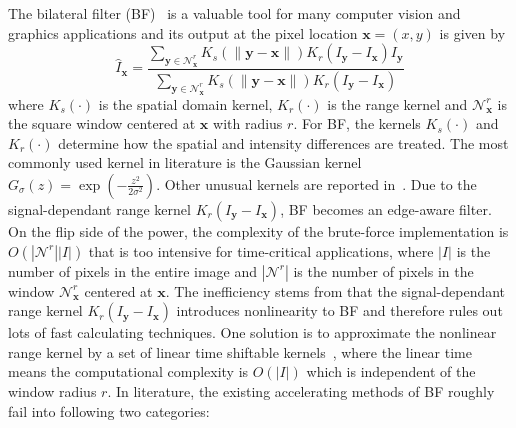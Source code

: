 \documentclass[twocolumn]{el-author}
\begin{document}
The bilateral filter (BF)~\cite{Tomasi_ICCV_1998} is a valuable tool for many computer vision and graphics applications and its output at the pixel location $\bm{x} = (x, y)$ is given by
%
\begin{equation}
\hat{I}_{\bm{x}} = \frac{\sum_{\bm{y} \in \mathcal{N}^r_{\bm{x}}} K_s(\| \bm{y} - \bm{x} \|) K_r( I_{\bm{y}} - I_{\bm{x}} ) I_{\bm{y}}}{\sum_{\bm{y} \in \mathcal{N}^r_{\bm{x}}} K_s(\| \bm{y} - \bm{x} \|) K_r( I_{\bm{y}} - I_{\bm{x}} )}
\label{eq:BF}
\end{equation}
%
where $K_s(\cdot)$ is the spatial domain kernel, $K_r(\cdot)$ is the range kernel and $\mathcal{N}^r_{\bm{x}}$ is the square window centered at $\bm{x}$ with radius $r$. For BF, the kernels $K_s(\cdot)$ and $K_r(\cdot)$ determine how the spatial and intensity differences are treated. The most commonly used kernel in literature is the Gaussian kernel $G_{\sigma}(z) = \exp(-\frac{z^2}{2\sigma^2})$. Other unusual kernels are reported in~\cite{Durand_2002_TOG}. Due to the signal-dependant range kernel $K_r( I_{\bm{y}} - I_{\bm{x}} )$, BF becomes an edge-aware filter. On the flip side of the power, the complexity of the brute-force implementation is $O(|\mathcal{N}^r||I|)$ that is too intensive for time-critical applications, where $|I|$ is the number of pixels in the entire image and $|\mathcal{N}^r|$ is the number of pixels in the window $\mathcal{N}^r_{\bm{x}}$ centered at $\bm{x}$. The inefficiency stems from that the signal-dependant range kernel $K_r( I_{\bm{y}} - I_{\bm{x}} )$ introduces nonlinearity to BF and therefore rules out lots of fast calculating techniques. One solution is to approximate the nonlinear range kernel by a set of linear time shiftable kernels~\cite{Chaudhury_SPL_2011}, where the linear time means the computational complexity is $O(|{I}|)$ which is independent of the window radius $r$.
In literature, the existing accelerating methods of BF roughly fail into following two categories:
\end{document}

